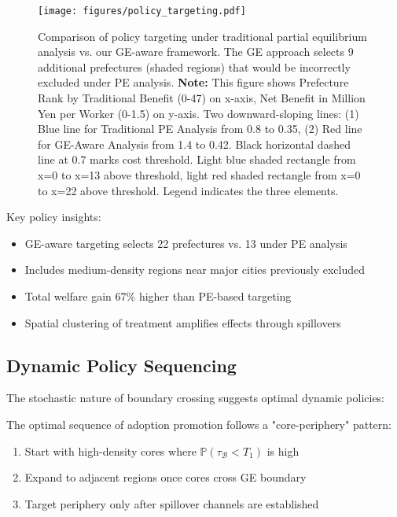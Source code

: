 \begin{figure}[htb]
\centering
\texttt{[image: figures/policy\_targeting.pdf]}
\caption{Comparison of policy targeting under traditional partial equilibrium analysis vs. our GE-aware framework. The GE approach selects 9 additional prefectures (shaded regions) that would be incorrectly excluded under PE analysis.
\textbf{Note:} This figure shows Prefecture Rank by Traditional Benefit (0-47) on x-axis, Net Benefit in Million Yen per Worker (0-1.5) on y-axis. Two downward-sloping lines: (1) Blue line for Traditional PE Analysis from 0.8 to 0.35, (2) Red line for GE-Aware Analysis from 1.4 to 0.42. Black horizontal dashed line at 0.7 marks cost threshold. Light blue shaded rectangle from x=0 to x=13 above threshold, light red shaded rectangle from x=0 to x=22 above threshold. Legend indicates the three elements.}
\label{fig:policy}
\end{figure}

Key policy insights:
\begin{itemize}
   \item GE-aware targeting selects 22 prefectures vs. 13 under PE analysis
   \item Includes medium-density regions near major cities previously excluded
   \item Total welfare gain 67\% higher than PE-based targeting
   \item Spatial clustering of treatment amplifies effects through spillovers
\end{itemize}

\subsection{Dynamic Policy Sequencing}

The stochastic nature of boundary crossing suggests optimal dynamic policies:

\begin{proposition}
The optimal sequence of adoption promotion follows a "core-periphery" pattern:
\begin{enumerate}
   \item Start with high-density cores where $\mathbb{P}(\tau_\mathcal{B} < T_1)$ is high
   \item Expand to adjacent regions once cores cross GE boundary
   \item Target periphery only after spillover channels are established
\end{enumerate}
\end{proposition}

